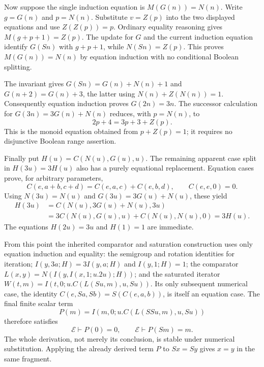 Now suppose the single induction equation is $M(G(n))=N(n)$.
Write $g=G(n)$ and $p=N(n)$.  Substitute $v=Z(p)$ into the two
displayed equations and use $Z(Z(p))=p$.  Ordinary equality reasoning
gives $M(g+p+1)=Z(p)$.  The update for $G$ and the current induction
equation identify $G(Sn)$ with $g+p+1$, while $N(Sn)=Z(p)$.
This proves $M(G(n))=N(n)$ by equation induction with no conditional
Boolean splitting.

The invariant gives $G(Sn)=G(n)+N(n)+1$ and
$G(n+2)=G(n)+3$, the latter using $N(n)+Z(N(n))=1$.
Consequently equation induction proves $G(2n)=3n$.  The successor
calculation for $G(3n)=3G(n)+N(n)$ reduces, with $p=N(n)$, to
\[
 2p+4=3p+3+Z(p).
\]
This is the monoid equation obtained from $p+Z(p)=1$; it requires no
disjunctive Boolean range assertion.

Finally put $H(u)=C(N(u),G(u),u)$.  The remaining apparent case split
in $H(3u)=3H(u)$ also has a purely equational replacement.  Equation
cases prove, for arbitrary parameters,
\[
 C(e,a+b,c+d)=C(e,a,c)+C(e,b,d),\qquad C(e,e,0)=0.
\]
Using $N(3u)=N(u)$ and $G(3u)=3G(u)+N(u)$, these yield
\begin{align*}
 H(3u)
 &=C(N(u),3G(u)+N(u),3u)\\
 &=3C(N(u),G(u),u)+C(N(u),N(u),0)=3H(u).
\end{align*}
The equations $H(2u)=3u$ and $H(1)=1$ are immediate.

From this point the inherited comparator and saturation construction
uses only equation induction and equality: the semigroup and rotation
identities for iteration; $I(y,3a;H)=3I(y,a;H)$ and
$I(y,1;H)=1$; the comparator
$L(x,y)=N(I(y,I(x,1;u.2u);H))$; and the saturated iterator
$W(t,m)=I(t,0;u.C(L(Su,m),u,Su))$.
Its only subsequent numerical case, the identity
$C(e,Sa,Sb)=S(C(e,a,b))$, is itself an equation case.
The final finite scalar term
\[
 P(m)=I(m,0;u.C(L(SSu,m),u,Su))
\]
therefore satisfies
\[
 \mathcal E\vdash P(0)=0,\qquad
 \mathcal E\vdash P(Sm)=m.
\]
The whole derivation, not merely its conclusion, is stable under numerical
substitution.  Applying the already derived term $P$ to $Sx=Sy$ gives
$x=y$ in the same fragment.
